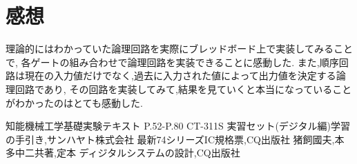 \documentclass[twocolumn, 10pt,a4j]{jsarticle}
\begin{document}
\section{感想}
理論的にはわかっていた論理回路を実際にブレッドボード上で実装してみることで,
各ゲートの組み合わせで論理回路を実装できることに感動した.
また,順序回路は現在の入力値だけでなく,過去に入力された値によって出力値を決定する論理回路であり,
その回路を実装してみて,結果を見ていくと本当になっていることがわかったのはとても感動した.

\begin{thebibliography}{3}
  \bibitem{}知能機械工学基礎実験テキスト P.52-P.80
  \bibitem{}CT-311S 実習セット(デジタル編)学習の手引き,サンハヤト株式会社
  \bibitem{}最新74シリーズIC規格票,CQ出版社
  \bibitem{}猪飼國夫,本多中二共著,定本 ディジタルシステムの設計,CQ出版社
\end{thebibliography}
\end{document}
